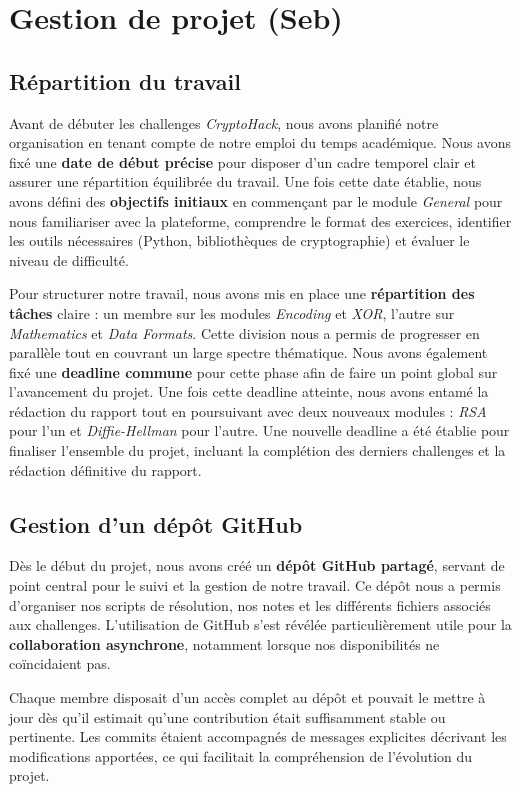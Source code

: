 \section{Gestion de projet (Seb)}
\subsection{Répartition du travail}
Avant de débuter les challenges \textit{CryptoHack}, nous avons planifié notre organisation en tenant compte de notre emploi du temps académique. Nous avons fixé une \textbf{date de début précise} pour disposer d'un cadre temporel clair et assurer une répartition équilibrée du travail. Une fois cette date établie, nous avons défini des \textbf{objectifs initiaux} en commençant par le module \textit{General} pour nous familiariser avec la plateforme, comprendre le format des exercices, identifier les outils nécessaires (Python, bibliothèques de cryptographie) et évaluer le niveau de difficulté.

Pour structurer notre travail, nous avons mis en place une \textbf{répartition des tâches} claire : un membre sur les modules \textit{Encoding} et \textit{XOR}, l'autre sur \textit{Mathematics} et \textit{Data Formats}. Cette division nous a permis de progresser en parallèle tout en couvrant un large spectre thématique. Nous avons également fixé une \textbf{deadline commune} pour cette phase afin de faire un point global sur l'avancement du projet. Une fois cette deadline atteinte, nous avons entamé la rédaction du rapport tout en poursuivant avec deux nouveaux modules : \textit{RSA} pour l'un et \textit{Diffie-Hellman} pour l'autre. Une nouvelle deadline a été établie pour finaliser l'ensemble du projet, incluant la complétion des derniers challenges et la rédaction définitive du rapport.

\subsection{Gestion d'un dépôt GitHub}
Dès le début du projet, nous avons créé un \textbf{dépôt GitHub partagé},
servant de point central pour le suivi et la gestion de notre travail. Ce
dépôt nous a permis d’organiser nos scripts de résolution, nos notes et les
différents fichiers associés aux challenges. L’utilisation de GitHub s’est
révélée particulièrement utile pour la \textbf{collaboration asynchrone},
notamment lorsque nos disponibilités ne coïncidaient pas.

Chaque membre disposait d’un accès complet au dépôt et pouvait le mettre à
jour dès qu’il estimait qu’une contribution était suffisamment stable ou
pertinente. Les commits étaient accompagnés de messages explicites
décrivant les modifications apportées, ce qui facilitait la compréhension
de l’évolution du projet.

